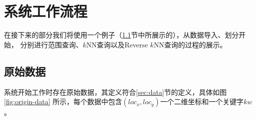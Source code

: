 \documentclass{ML}
\def\n{2} %
\def\maxxy{6} %
\begin{document}
\section{系统工作流程}
在接下来的部分我们将使用一个例子（\ref{sec:example}节中所展示的），从数据导入、划分开始，
分别进行范围查询、$k$NN查询以及Reverse $k$NN查询的过程的展示。
\subsection{原始数据}\label{sec:example}
系统开始工作时存在原始数据，其定义符合\ref{sec:data}节的定义，具体如图\ref{fig:origin-data}
所示，每个数据中包含$(loc_x, loc_y)$一个二维坐标和一个关键字$kw$。
\begin{figure}[H]
  \centering
\end{figure}
\end{document}
